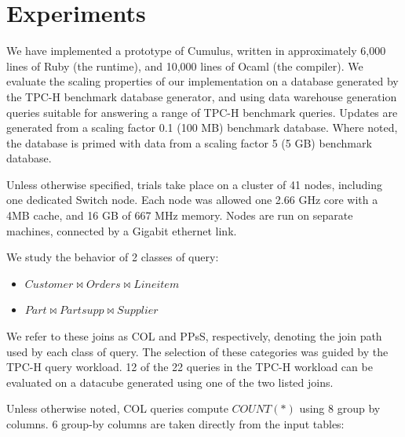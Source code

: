 
\section{Experiments}
\label{sec:experiments}

We have implemented a prototype of Cumulus, written in approximately 6,000 lines of Ruby (the runtime), and 10,000 lines of Ocaml (the compiler).  We evaluate the scaling properties of our implementation on a database generated by the TPC-H benchmark database generator, and using data warehouse generation queries suitable for answering a range of TPC-H benchmark queries.  Updates are generated from a scaling factor 0.1 (100 MB) benchmark database.  Where noted, the database is primed with data from a scaling factor 5 (5 GB) benchmark database.

Unless otherwise specified, trials take place on a cluster of 41 nodes, including one dedicated Switch node.  Each node was allowed one 2.66 GHz core with a 4MB cache, and 16 GB of 667 MHz memory.  Nodes are run on separate machines, connected by a Gigabit ethernet link.  %

We study the behavior of 2 classes of query: 
\begin{itemize}
\item $Customer \bowtie Orders \bowtie Lineitem$
\item $Part \bowtie Partsupp \bowtie Supplier$
\end{itemize}
We refer to these joins as COL and PPsS, respectively, denoting the join path used by each class of query.  The selection of these categories was guided by the TPC-H query workload.  12 of the 22 queries in the TPC-H workload can be evaluated on a datacube generated using one of the two listed joins.  

Unless otherwise noted, COL queries compute $COUNT(*)$ using 8 group by columns.  6 group-by columns are taken directly from the input tables: 

